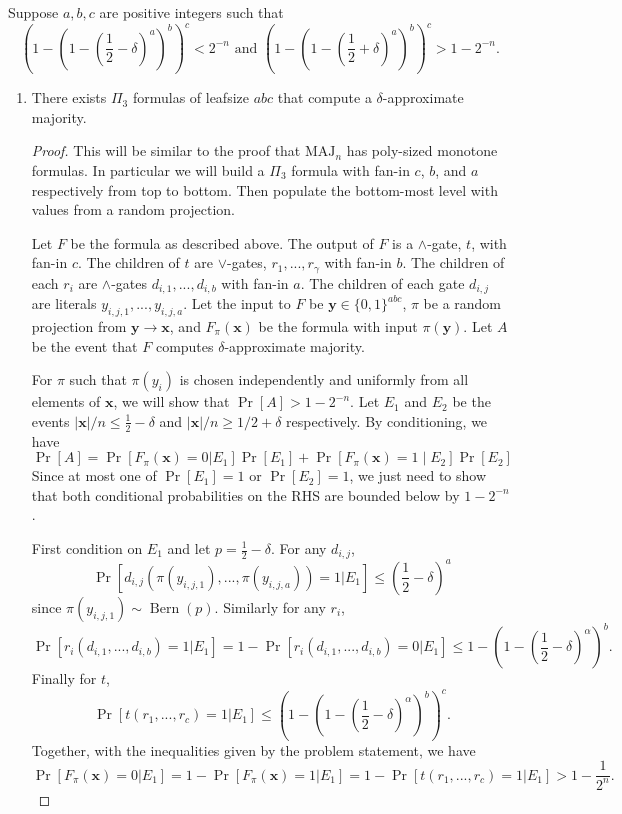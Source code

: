 \documentclass[11pt]{article}
\newcommand\ff[1]{\mathrm{#1}}
\newcommand\vv[1]{\mathbf{#1}}
\DeclareMathOperator*\bern{\mathrm{Bern}}
\begin{document}
Suppose $a, b, c$ are positive integers such that
\begin{equation}
	\label{eq:Q5Condition}
	\left(1 - \left(1 - \left(\frac{1}{2} - \delta\right)^a\right)^b\right)^c < 2^{-n} \mbox{ and } \left(1 - \left(1 - \left(\frac{1}{2} + \delta\right)^a\right)^b\right)^c > 1 - 2^{-n}.
\end{equation}
\begin{enumerate}
\item There exists $\Pi_3$ formulas of leafsize $abc$ that compute a $\delta$-approximate majority.
\begin{proof}
This will be similar to the proof that $\ff{MAJ}_n$ has poly-sized monotone formulas. In particular we will build a $\Pi_3$ formula with fan-in $c$, $b$, and $a$ respectively from top to bottom. Then populate the bottom-most level with values from a random projection.

Let $F$ be the formula as described above. The output of $F$ is a $\land$-gate, $t$, with fan-in $c$. The children of $t$ are $\lor$-gates, $r_1, ..., r_\gamma$ with fan-in $b$. The children of each $r_i$ are $\land$-gates $d_{i,1}, ..., d_{i,b}$ with fan-in $a$. The children of each gate $d_{i,j}$ are literals $y_{i,j,1}, ..., y_{i,j,a}$. Let the input to $F$ be $\vv{y} \in \{0,1\}^{abc}$, $\pi$ be a random projection from $\vv{y} \rightarrow \vv{x}$, and $F_{\pi}(\vv{x})$ be the formula with input $\pi(\vv{y})$. Let $A$ be the event that $F$ computes $\delta$-approximate majority. 

For $\pi$ such that $\pi(y_i)$ is chosen independently and uniformly from all elements of $\vv{x}$, we will show that $\Pr[A] > 1 - 2^{-n}$. Let $E_1$ and $E_2$ be the events $|\vv{x}|/n \leq \frac{1}{2} - \delta$ and $|\vv{x}|/n \geq 1/2 + \delta$ respectively. By conditioning, we have 
\[\Pr[A] = \Pr\left[F_{\pi}(\vv{x}) = 0 | E_1\right]\Pr\left[E_1\right] + \Pr\left[F_{\pi}(\vv{x}) = 1\middle|E_2\right]\Pr\left[E_2\right]\]
Since at most one of $\Pr[E_1] = 1$ or $\Pr[E_2] = 1$, we just need to show that both conditional probabilities on the RHS are bounded below by $1 - 2^{-n}$.

First condition on $E_1$ and let $p = \frac{1}{2} - \delta$. For any $d_{i,j}$, \[\Pr[d_{i,j}(\pi(y_{i,j,1}), ..., \pi(y_{i,j,a})) = 1| E_1] \leq \left(\frac{1}{2} - \delta\right)^{a}\]
since $\pi(y_{i,j,1}) \sim \bern(p)$. Similarly for any $r_i$, 
\[\Pr[r_{i}(d_{i,1}, ..., d_{i,b}) = 1|E_1] = 1 - \Pr[r_{i}(d_{i,1}, ..., d_{i,b}) = 0|E_1] \leq 1 - \left(1 - \left(\frac{1}{2} - \delta\right)^{\alpha}\right)^{b}.\]
Finally for $t$, 
\[\Pr[t(r_{1}, ..., r_{c}) = 1|E_1] \leq \left(1 - \left(1 - \left(\frac{1}{2} - \delta\right)^{\alpha}\right)^{b}\right)^{c}.\]
Together, with the inequalities given by the problem statement, we have 
\[\Pr[F_{\pi}(\vv{x}) = 0 | E_1] = 1 - \Pr[F_{\pi}(\vv{x}) = 1 | E_1] = 1 - \Pr[t(r_{1}, ..., r_{c}) = 1| E_1] > 1 - \frac{1}{2^{n}}.\]


\end{proof}
\end{enumerate}
\end{document}
